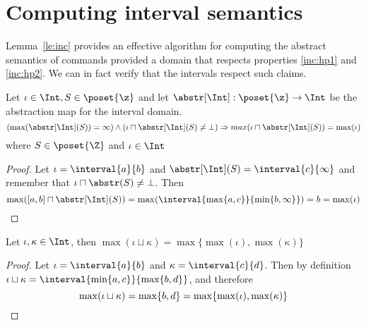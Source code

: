 \section{Computing interval semantics}
\label{sec:computingint}

Lemma~\ref{le:inc} provides an effective algorithm for computing the
abstract semantics of commands provided a domain that respects
properties \ref{inc:hp1} and \ref{inc:hp2}. We can in fact verify that
the intervals respect such claims.

\begin{observation}
  Let \(\iota \in \Int, S \in \poset{\z}\) and let
  \({\abstr[\Int] : \poset{\z} \to \Int}\) be the abstraction map for
  the interval domain. 
  \begin{equation*}
    \left(\max(\abstr[\Int](S)) = \infty\right) \land \left(\iota \sqcap \abstr[\Int](S) \neq \bot\right)
    \Rightarrow max(\iota \sqcap \abstr[\Int](S)) = \max(\iota)
  \end{equation*}
  where \(S \in \poset{\Z}\) and \(\iota \in \Int\)
\end{observation}

\begin{proof}
  Let \(\iota = \interval{a}{b}\) and
  \(\abstr[\Int](S) = \interval{c}{\infty}\) and remember that
  \({\iota \sqcap \abstr(S) \neq \bot}\). Then
  \begin{equation*}
    \max([a,b] \sqcap \abstr[\Int](S)) = \max(\interval{\max\{a, c\}}{\min\{b , \infty\}}) = b = \max(\iota) \qedhere
  \end{equation*}
\end{proof}

\begin{observation}
  Let \(\iota, \kappa \in \Int\), then
  \(\max(\iota \sqcup \kappa) = \max\{\max(\iota), \max(\kappa)\}\)
\end{observation}

\begin{proof}
  Let \(\iota = \interval{a}{b}\) and \(\kappa =
  \interval{c}{d}\). Then by definition
  \(\iota \sqcup \kappa = \interval{\min\{a,c\}}{\max\{b,d\}}\), and
  therefore
  \begin{equation*}
    \max(\iota \sqcup \kappa) = \max\{b,d\} = \max\{\max(\iota), \max(\kappa)\} \qedhere
  \end{equation*}
\end{proof}

